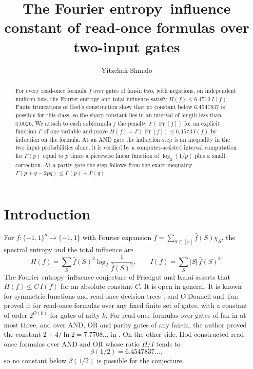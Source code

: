 \documentclass[11pt]{amsart}
\title{The Fourier entropy--influence constant of read-once formulas over two-input gates}
\author{Yitzchak Shmalo}
\date{}
\theoremstyle{remark}
\renewcommand{\Pr}{\operatorname{Pr}}
\begin{document}
\begin{abstract}
For every read-once formula $f$ over gates of fan-in two, with negations, on independent uniform bits, the Fourier entropy and total influence satisfy $H(f)\le 6.4573\,I(f)$. Finite truncations of Hod's construction show that no constant below $6.4547837$ is possible for this class, so the sharp constant lies in an interval of length less than $0.0026$. We attach to each subformula $f$ the penalty $\Gamma(\Pr[f])$ for an explicit function $\Gamma$ of one variable and prove $H(f)+\Gamma(\Pr[f])\le 6.4573\,I(f)$ by induction on the formula. At an AND gate the induction step is an inequality in the two input probabilities alone; it is verified by a computer-assisted interval computation for $\Gamma(p)$ equal to $p$ times a piecewise linear function of $\log_2(1/p)$ plus a small correction. At a parity gate the step follows from the exact inequality $\Gamma(p+q-2pq)\le\Gamma(p)+\Gamma(q)$.
\end{abstract}

\maketitle

\section{Introduction}

For $f\colon\{-1,1\}^n\to\{-1,1\}$ with Fourier expansion $f=\sum_{S\subseteq[n]}\hat f(S)\chi_S$, the spectral entropy and the total influence are
\[
H(f)=\sum_{S}\hat f(S)^2\log_2\frac{1}{\hat f(S)^2},\qquad I(f)=\sum_S |S|\,\hat f(S)^2 .
\]
The Fourier entropy--influence conjecture of Friedgut and Kalai \cite{FK96} asserts that $H(f)\le C\,I(f)$ for an absolute constant $C$. It is open in general. It is known for symmetric functions and read-once decision trees \cite{OWZ11}, and O'Donnell and Tan \cite{OT13} proved it for read-once formulas over any fixed finite set of gates, with a constant of order $2^{O(k)}$ for gates of arity $k$. For read-once formulas over gates of fan-in at most three, and over AND, OR and parity gates of any fan-in, the author proved the constant $2+4/\ln 2=7.7708\ldots$ in \cite[Corollaries 7.9 and 7.11]{Shm26}. On the other side, Hod \cite{Hod17} constructed read-once formulas over AND and OR whose ratio $H/I$ tends to
\[
\beta(1/2)=6.4547837\ldots,
\]
so no constant below $\beta(1/2)$ is possible for the conjecture.
\end{document}
